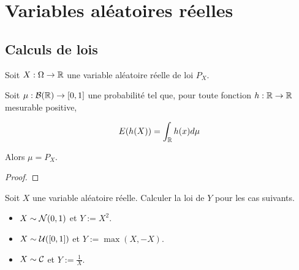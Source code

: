 \chapter{Variables aléatoires réelles}

\label{chapter:variables_aleatoires_reelles}

\section{Calculs de lois}

\begin{proposition}
	Soit $X : \Omega \rightarrow \mathbb{R}$ une variable aléatoire réelle de loi
	$P_{X}$.

	Soit $\mu : \mathcal{B}(\mathbb{R}) \rightarrow [0, 1]$ une probabilité
	tel que, pour toute fonction $h : \mathbb{R} \rightarrow \mathbb{R}$ mesurable
	positive,

	\begin{equation}
		E(h(X)) = \int_{\mathbb{R}} h(x) d\mu
	\end{equation}

	Alors $\mu = P_{X}$.
\end{proposition}

\ifdefined\outputproof
\begin{proof}

\end{proof}
\fi

\begin{exercice}
	Soit $X$ une variable aléatoire réelle. Calculer la loi de $Y$ pour les cas
	suivants.
	\begin{itemize}
		\item $X \sim \mathcal{N}(0, 1)$ et $Y := X^{2}$.
		\item $X \sim \mathcal{U}([0, 1])$ et $Y := \max(X, -X)$.
		\item $X \sim \mathcal{C}$ et $Y := \frac{1}{X}$.
	\end{itemize}
\end{exercice}
